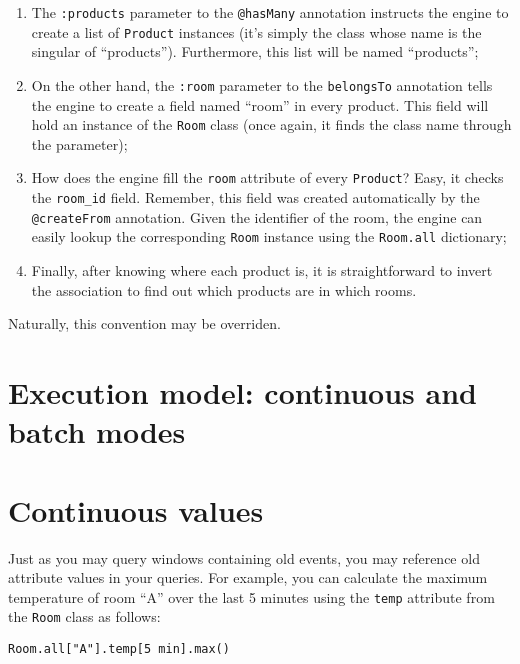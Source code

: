 \documentclass{report}
\begin{document}
\begin{enumerate}
\item The \verb=:products= parameter to the \verb=@hasMany= annotation
  instructs the engine to create a list of \verb=Product= instances
  (it's simply the class whose name is the singular of
  ``products''). Furthermore, this list will be named ``products'';
\item On the other hand, the \verb=:room= parameter to the
  \verb=belongsTo= annotation tells the engine to create a field named
  ``room'' in every product. This field will hold an instance of the
  \verb=Room= class (once again, it finds the class name through the
  parameter);
\item How does the engine fill the \verb=room= attribute of every
  \verb=Product=? Easy, it checks the \verb=room_id= field. Remember,
  this field was created automatically by the \verb=@createFrom=
  annotation. Given the identifier of the room, the engine can easily
  lookup the corresponding \verb=Room= instance using the
  \verb=Room.all= dictionary;
\item Finally, after knowing where each product is, it is
  straightforward to invert the association to find out which products
  are in which rooms.
\end{enumerate}

Naturally, this convention may be overriden.


\chapter{Execution model: continuous and batch modes}



\chapter{Continuous values}
\label{chap:continuous-values}

Just as you may query windows containing old events, you may reference
old attribute values in your queries. For example, you can calculate
the maximum temperature of room ``A'' over the last 5 minutes using
the \verb=temp= attribute from the \verb=Room= class as follows:

\begin{verbatim}
Room.all["A"].temp[5 min].max()
\end{verbatim}
\end{document}

